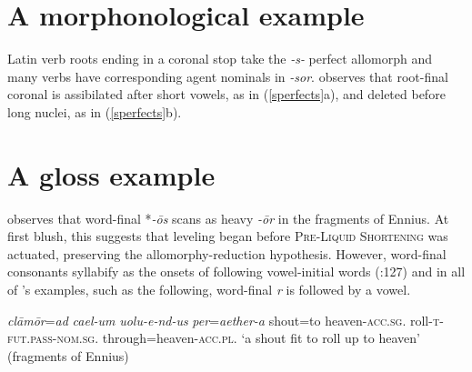 \documentclass[draft,12pt]{article}
\begin{document}
\section{A morphonological example}

Latin verb roots ending in a coronal stop take the \emph{-s-} perfect allomorph and many verbs have corresponding agent nominals in \emph{-sor}. \citet{Heslin1987} observes that root-final coronal is assibilated after short vowels, as in (\ref{sperfects}a), and deleted before long nuclei, as in (\ref{sperfects}b).


\section{A gloss example}

\citet{Albright2005} observes that word-final *\emph{-ōs} scans as heavy \emph{-ōr} in the fragments of Ennius. 
At first blush, this suggests that leveling began before \textsc{Pre-Liquid Shortening} was actuated, preserving the allomorphy-reduction hypothesis.
However, word-final consonants syllabify as the onsets of following vowel-initial words (\citealt{Allen1978}:127) and in all of \citeauthor{Albright2005}'s examples, such as the following, word-final \emph{r} is followed by a vowel.

\begin{example}
\gll \emph{clāmōr}=\emph{ad} \emph{cael-um}          \emph{uolu-e-nd-us}                                \emph{per}=\emph{aether-a}
     shout=to                heaven-\textsc{acc.sg.} roll-\textsc{t}-\textsc{fut.pass}-\textsc{nom.sg.} through=heaven-\textsc{acc.pl.}
\glt `a shout fit to roll up to heaven' (fragments of Ennius)
\glend
\end{example}
\end{document}
